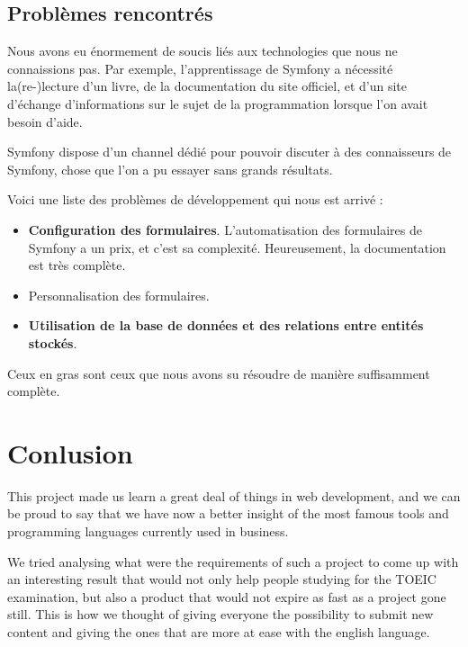 \documentclass[12pt,a4paper]{report}
\begin{document}
\subsection{Problèmes rencontrés}
Nous avons eu énormement de soucis liés aux technologies que nous ne
connaissions pas. Par exemple, l'apprentissage de Symfony a nécessité
la(re-)lecture d'un livre, de la documentation du site officiel, et d'un site
d'échange d'informations\cite{so} sur le sujet de la programmation lorsque l'on
avait besoin d'aide.

Symfony dispose d'un channel dédié\cite{freenode} pour pouvoir discuter à des
connaisseurs de Symfony, chose que l'on a pu essayer sans grands résultats.

Voici une liste des problèmes de développement qui nous est arrivé :

\begin{itemize}
	\item \textbf{Configuration des formulaires}. L'automatisation des 
	formulaires de Symfony a un prix, et c'est sa complexité. Heureusement,
	la documentation\cite{docform} est très complète.
	\item Personnalisation des formulaires. 
	\item \textbf{Utilisation de la base de données et des relations entre
	entités stockés}.
\end{itemize}

Ceux en gras sont ceux que nous avons su résoudre de manière suffisamment complète.

\section*{Conlusion}
This project made us learn a great deal of things in web development, and we
can be proud to say that we have now a better insight of the most famous tools
and programming languages currently used in business.
 
We tried analysing what were the requirements of such a project to come up with
an interesting result that would not only help people studying for the TOEIC
examination, but also a product that would not expire as fast as a project gone
still. This is how we thought of giving everyone the possibility to submit new
content and giving the ones that are more at ease with the english language.


\end{document}
